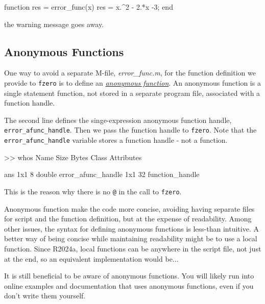 \begin{code}
function res = error_func(x)
    res = x.^2 - 2.*x -3;
end
\end{code}
the warning message goes away.

\subsection{Anonymous Functions}

One way to avoid a separate M-file, \emph{error\_func.m}, for the function definition we provide to \lstinline{fzero} is to define an 
\href{https://www.mathworks.com/help/matlab/matlab_prog/anonymous-functions.html}{\emph{anonymous function}}.  
An anonymous function is a single statement function, not stored in a separate program file, associated with a function handle.  



The second line defines the singe-expression anonymous function handle, \lstinline{error_afunc_handle}.  Then we pass the function handle to \lstinline{fzero}.  Note that the \lstinline{error_afunc_handle} variable stores a function handle - not a function.
\begin{code}
    >> whos
  Name                    Size            Bytes  Class              Attributes

  ans                     1x1                 8  double                       
  error_afunc_handle      1x1                32  function_handle    
\end{code}
This is the reason why there is no \lstinline{@} in the call to \lstinline{fzero}.

Anonymous function make the code more concise, avoiding having separate files for script and the function definition, but at the expense of readability.  Among other issues, the syntax for defining anonymous functions is less-than intuitive.  A better way of being concise while maintaining readability might be to use a local function.  Since R2024a, local functions can be anywhere in the script file, not just at the end, so an equivalent implementation would be...



It is still beneficial to be aware of anonymous functions.  You will likely run into online examples and documentation that uses anonymous functions, even if you don't write them yourself.

